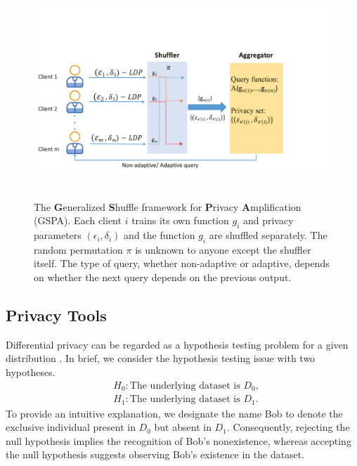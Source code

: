 \documentclass[letterpaper]{article} %
\begin{document}
\begin{figure}
  \centering
  \includegraphics[scale = 0.3]{picture/ShufflePlot.pdf}\\
  ~\\
  \caption{The {\bf G}eneralized {\bf S}huffle framework for {\bf P}rivacy {\bf A}mplification (GSPA). Each client $i$ trains its own function $g_i$ and privacy parameters $(\epsilon_i,\delta_i)$ and the function $g_i$ are shuffled separately.
  The random permutation $\pi$ is unknown to anyone except the shuffler itself.
  The type of query, whether non-adaptive or adaptive, depends on whether the next query depends on the previous output.
  }\label{Fig:ShufflePlot}
\end{figure}

\subsection{Privacy Tools}
Differential privacy can be regarded as a hypothesis testing problem for a given distribution \cite{Kairouz2015composition}.
 In brief, we consider the hypothesis testing issue with two hypotheses.
\begin{align*}
&H_0: \text{The underlying dataset is } D_0, \\
&H_1: \text{The underlying dataset is } D_1.
\end{align*}
To provide an intuitive explanation, we designate the name Bob to denote the exclusive individual present in $D_0$ but absent in $D_1$.
Consequently, rejecting the null hypothesis implies the recognition of Bob's nonexistence, whereas accepting the null hypothesis suggests observing Bob's existence in the dataset.
\end{document}
